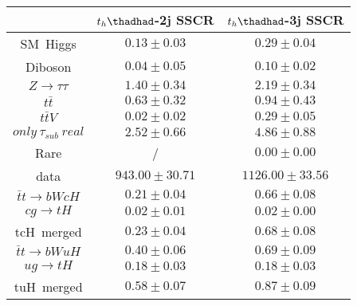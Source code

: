 \centering
\begin{tabular}{ccc} \toprule\toprule
 & $t_{h}\thadhad$-2j SSCR & $t_{h}\thadhad$-3j SSCR \\  \midrule
SM~Higgs & $0.13\pm0.03$ & $0.29\pm0.04$\\
Diboson & $0.04\pm0.05$ & $0.10\pm0.02$\\
$Z\to\tau\tau$ & $1.40\pm0.34$ & $2.19\pm0.34$\\
$t\bar{t}$ & $0.63\pm0.32$ & $0.94\pm0.43$\\
$t\bar{t}V$ & $0.02\pm0.02$ & $0.29\pm0.05$\\
$only~\tau_{sub}~real$ & $2.52\pm0.66$ & $4.86\pm0.88$\\
Rare &  / & $0.00\pm0.00$\\
data & $943.00\pm30.71$ & $1126.00\pm33.56$\\
$\bar{t}t\to bWcH$ & $0.21\pm0.04$ & $0.66\pm0.08$\\
$cg\to tH$ & $0.02\pm0.01$ & $0.02\pm0.00$\\
tcH~merged & $0.23\pm0.04$ & $0.68\pm0.08$\\
$\bar{t}t\to bWuH$ & $0.40\pm0.06$ & $0.69\pm0.09$\\
$ug\to tH$ & $0.18\pm0.03$ & $0.18\pm0.03$\\
tuH~merged & $0.58\pm0.07$ & $0.87\pm0.09$\\
\bottomrule\bottomrule
\end{tabular}


